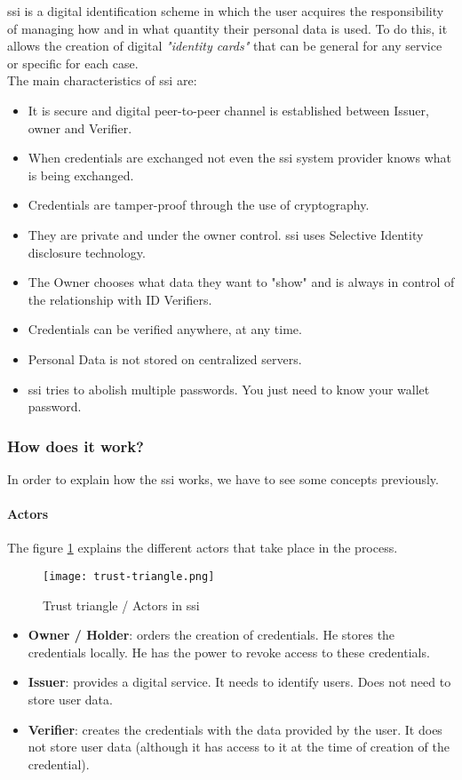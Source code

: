\acrfull{ssi} is a digital identification scheme in which the user acquires the responsibility of managing how and in what quantity their personal data is used. To do this, it allows the creation of digital \textit{"identity cards"} that can be general for any service or specific for each case. \\
The main characteristics of \acrlong{ssi} are\cite{ssi-guide}:
\begin{itemize}
    \item It is secure and digital peer-to-peer channel is established between Issuer, owner and Verifier.
    \item When credentials are exchanged not even the \acrlong{ssi} system provider knows what is being exchanged.
    \item Credentials are tamper-proof through the use of cryptography.
    \item They are private and under the owner control. \acrshort{ssi} uses Selective Identity disclosure technology.
    \item The Owner chooses what data they want to "show" and is always in control of the relationship with ID Verifiers.
    \item Credentials can be verified anywhere, at any time.
    \item Personal Data is not stored on centralized servers.
    \item \acrshort{ssi} tries to abolish multiple passwords. You just need to know your wallet password.
\end{itemize}

\subsubsection{How does it work?}
In order to explain how the \acrshort{ssi} works, we have to see some concepts previously.
\paragraph{Actors}
The figure \ref{fig:trust-triangle} explains the different actors\cite{ssi-guide} that take place in the process.
\begin{figure}[h]
    \centering
    \texttt{[image: trust-triangle.png]}
    \caption{Trust triangle / Actors in \acrshort{ssi}}
    \label{fig:trust-triangle}
\end{figure}
\begin{itemize}
    \item \textbf{Owner / Holder}: orders the creation of credentials. He stores the credentials locally. He has the power to revoke access to these credentials.
    \item \textbf{Issuer}: provides a digital service. It needs to identify users. Does not need to store user data.
    \item \textbf{Verifier}: creates the credentials with the data provided by the user. It does not store user data (although it has access to it at the time of creation of the credential).
\end{itemize}

